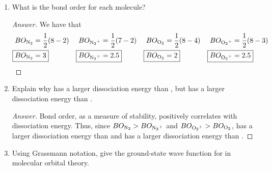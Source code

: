 \documentclass[../psets.tex]{subfiles}
\begin{document}
\begin{enumerate}
\begin{enumerate}
\begin{proof}[Answer]
\begin{figure}[h!]
\begin{subfigure}[b]{0.49\linewidth}
                    \caption{.}
                \end{subfigure}
            \end{figure}
        \end{proof}
        \item What is the bond order for each molecule?
        \begin{proof}[Answer]
            We have that
            \begin{align*}
                BO_{\ce{N2}} &= \frac{1}{2}(8-2)&
                    BO_{\ce{N2+}} &= \frac{1}{2}(7-2)&
                        BO_{\ce{O2}} &= \frac{1}{2}(8-4)&
                            BO_{\ce{O2+}} &= \frac{1}{2}(8-3)\\
                \Aboxed{BO_{\ce{N2}} &= 3}&
                    \Aboxed{BO_{\ce{N2+}} &= 2.5}&
                        \Aboxed{BO_{\ce{O2}} &= 2}&
                            \Aboxed{BO_{\ce{O2+}} &= 2.5}
            \end{align*}
        \end{proof}
        \item Explain why  has a larger dissociation energy than , but  has a larger dissociation energy than .
        \begin{proof}[Answer]
            Bond order, as a measure of stability, positively correlates with dissociation energy. Thus, since $BO_{\ce{N2}}>BO_{\ce{N2+}}$ and $BO_{\ce{O2+}}>BO_{\ce{O2}}$,  has a larger dissociation energy than  and  has a larger dissociation energy than .
        \end{proof}
        \item Using Grassmann notation, give the ground-state wave function for  in molecular orbital theory.

\end{enumerate}
\end{enumerate}
\end{document}
